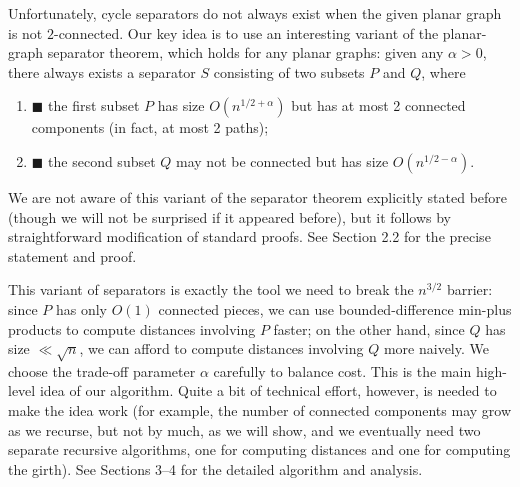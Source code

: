 \par
\par
Unfortunately, cycle separators do not always exist when the given planar graph is not $2$-connected. Our key idea is to use an interesting variant of the planar-graph separator theorem, which holds for any planar graphs: given any $\alpha>0$, there always exists a separator $S$ consisting of two subsets $P$ and $Q$, where
\par
\begin{enumerate}
\item[]  $\blacksquare$ 
the first subset $P$ has size $O(n^{1/2+\alpha})$ but has at most 2 connected components (in fact, at most 2 paths);
\par
\par
\item[]  $\blacksquare$ 
the second subset $Q$ may not be connected but has size $O(n^{1/2-\alpha})$.
\par
\par
\end{enumerate}
\par
We are not aware of this variant of the separator theorem explicitly stated before (though we will not be surprised if it appeared before), but it follows by straightforward modification of standard proofs. See Section 2.2 for the precise statement and proof.
\par
\par
This variant of separators is exactly the tool we need to break the $n^{3/2}$ barrier: since $P$ has only $O(1)$ connected pieces, we can use bounded-difference min-plus products to compute distances involving $P$ faster; on the other hand, since $Q$ has size $\ll\sqrt{n}$, we can afford to compute distances involving $Q$ more naively. We choose the trade-off parameter $\alpha$ carefully to balance cost. This is the main high-level idea of our algorithm. Quite a bit of technical effort, however, is needed to make the idea work (for example, the number of connected components may grow as we recurse, but not by much, as we will show, and we eventually need two separate recursive algorithms, one for computing distances and one for computing the girth). See Sections 3–4 for the detailed algorithm and analysis.
\par
\par
